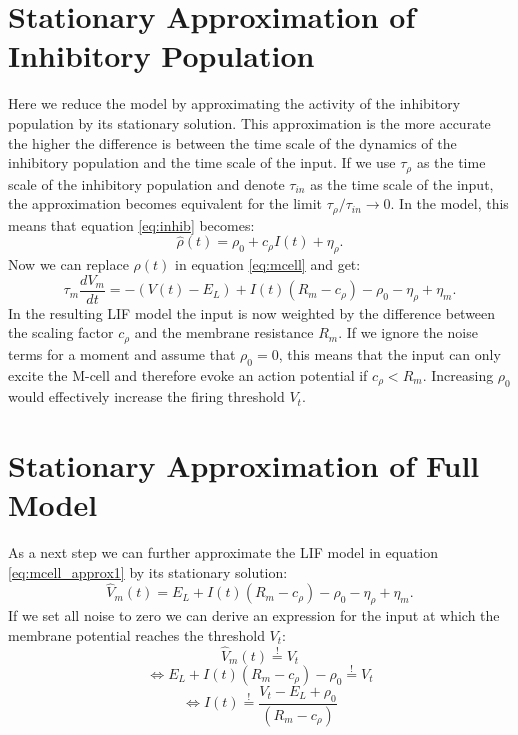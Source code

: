 	\section{Stationary Approximation of Inhibitory Population}\label{approx inhibition}
	Here we reduce the model by approximating the activity of the inhibitory population by its 
	stationary solution.
	This approximation is the more accurate the higher the difference is between the time scale of the dynamics of the inhibitory population and the time scale of the input.
	If we use $\tau_{\rho}$ as the time scale of the inhibitory population and denote $\tau_{in}$ as the time scale of the input, the approximation becomes equivalent for the limit $\tau_{\rho}/ \tau_{in} \rightarrow 0$.
	In the model, this means that equation \ref{eq:inhib} becomes:
	\begin{equation}
	\hat{\rho} (t) = \rho_{0} + c_{\rho} I(t) + \eta_{\rho}.
	\label{eq:inhib_approx}
	\end{equation}
	Now we can replace $\rho (t)$ in equation \ref{eq:mcell} and get:
	\begin{equation}
	\tau _m \frac{dV_m}{dt} = - (V(t) - E_{L}) + I(t)(R_{m} - c_{\rho}) - \rho_{0} - 
	\eta_{\rho} +  \eta _m.
	\label{eq:mcell_approx1}
	\end{equation}
	In the resulting LIF model the input is now weighted by the difference between the scaling 
	factor $c_{\rho}$ and the membrane resistance $R_m$.
	If we ignore the noise terms for a moment and assume that $\rho_{0}=0$, this means that the 
	input can only excite the M-cell and therefore evoke an action potential if $c_{\rho} < R_m$.
	Increasing $\rho_{0}$ would effectively increase the firing threshold $V_t$.
	\section{Stationary Approximation of Full Model}\label{approx full model}
	As a next step we can further approximate the LIF model in equation \ref{eq:mcell_approx1} by 
	its stationary solution:
	\begin{equation}
	\hat{V}_m(t) = E_{L} + I(t)(R_{m} - c_{\rho}) - \rho_{0} - 
	\eta_{\rho} +  \eta _m.
	\end{equation}
	If we set all noise to zero we can derive an expression for the input at which the membrane 
	potential reaches the threshold $V_{t}$:
	\begin{equation}
	\hat{V}_m(t) \overset{!}{=} V_t
	\end{equation}
	\begin{equation}
	\Leftrightarrow E_{L} + I(t)(R_{m} - c_{\rho}) - \rho_{0} 
	\overset{!}{=} V_t
	\end{equation}
	\begin{equation}
	\Leftrightarrow I(t)
	\overset{!}{=} \frac{V_t - E_{L} + \rho_{0}}{(R_{m} - c_{\rho})}
	\label{eq:crit_input}
	\end{equation}
